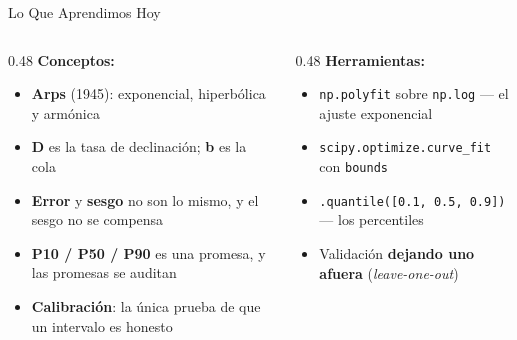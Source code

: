 \documentclass[aspectratio=169, 11pt]{beamer}
\begin{document}
\begin{frame}[shrink=10]{Lo Que Aprendimos Hoy}
  \vspace{-4pt}
  \begin{columns}[T]
    \begin{column}{0.48\textwidth}
      {\small\color{arcaDark}\bfseries\faLightbulb[regular]\hspace{5pt}Conceptos:}
      \vspace{4pt}
      {\footnotesize\color{textMuted}
      \begin{itemize}\setlength{\itemsep}{3pt}
        \item[{\color{codeGreen}\scriptsize\faCheck}]
          \textbf{Arps} (1945): exponencial, hiperbólica y armónica
        \item[{\color{codeGreen}\scriptsize\faCheck}]
          \textbf{D} es la tasa de declinación; \textbf{b} es la cola
        \item[{\color{codeGreen}\scriptsize\faCheck}]
          \textbf{Error} y \textbf{sesgo} no son lo mismo, y el sesgo
          no se compensa
        \item[{\color{codeGreen}\scriptsize\faCheck}]
          \textbf{P10 / P50 / P90} es una promesa, y las promesas se auditan
        \item[{\color{codeGreen}\scriptsize\faCheck}]
          \textbf{Calibración}: la única prueba de que un intervalo es honesto
      \end{itemize}}
    \end{column}
    \begin{column}{0.48\textwidth}
      {\small\color{arcaDark}\bfseries\faTools\hspace{5pt}Herramientas:}
      \vspace{4pt}
      {\footnotesize\color{textMuted}
      \begin{itemize}\setlength{\itemsep}{3pt}
        \item[{\color{arcaRed}\scriptsize\faArrowRight}]
          \texttt{np.polyfit} sobre \texttt{np.log} --- el ajuste exponencial
        \item[{\color{arcaRed}\scriptsize\faArrowRight}]
          \texttt{scipy.optimize.curve\_fit} con \texttt{bounds}
        \item[{\color{arcaRed}\scriptsize\faArrowRight}]
          \texttt{.quantile([0.1, 0.5, 0.9])} --- los percentiles
        \item[{\color{arcaRed}\scriptsize\faArrowRight}]
          Validación \textbf{dejando uno afuera} (\emph{leave-one-out})

\end{itemize}}
\end{column}
\end{columns}
\end{frame}
\end{document}
